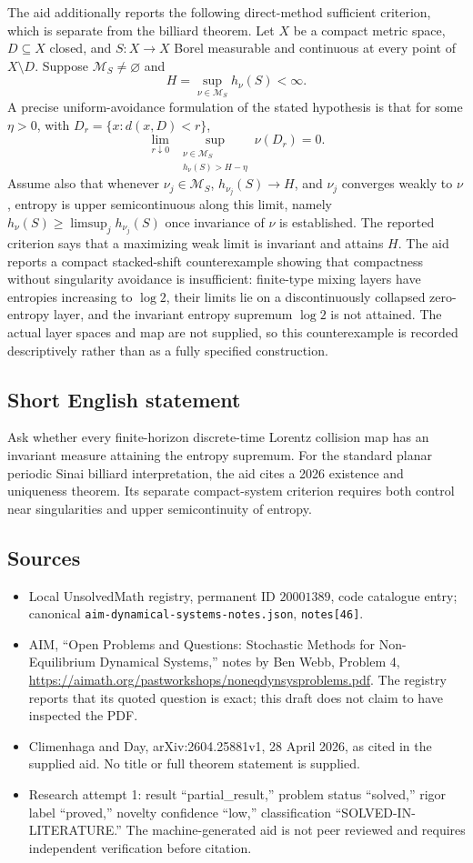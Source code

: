 \documentclass[11pt]{article}
\begin{document}
The aid additionally reports the following direct-method sufficient criterion, which is separate from the billiard theorem. Let \(X\) be a compact metric space, \(D\subseteq X\) closed, and \(S:X\to X\) Borel measurable and continuous at every point of \(X\setminus D\). Suppose \(\mathcal M_S\ne\varnothing\) and
\[
 H=\sup_{\nu\in\mathcal M_S}h_\nu(S)<\infty.
\]
A precise uniform-avoidance formulation of the stated hypothesis is that for some \(\eta>0\), with \(D_r=\{x:d(x,D)<r\}\),
\[
 \lim_{r\downarrow0}\ \sup_{\substack{\nu\in\mathcal M_S\\h_\nu(S)>H-\eta}}\nu(D_r)=0.
\]
Assume also that whenever \(\nu_j\in\mathcal M_S\), \(h_{\nu_j}(S)\to H\), and \(\nu_j\) converges weakly to \(\nu\), entropy is upper semicontinuous along this limit, namely \(h_\nu(S)\geq\limsup_jh_{\nu_j}(S)\) once invariance of \(\nu\) is established. The reported criterion says that a maximizing weak limit is invariant and attains \(H\). The aid reports a compact stacked-shift counterexample showing that compactness without singularity avoidance is insufficient: finite-type mixing layers have entropies increasing to \(\log2\), their limits lie on a discontinuously collapsed zero-entropy layer, and the invariant entropy supremum \(\log2\) is not attained. The actual layer spaces and map are not supplied, so this counterexample is recorded descriptively rather than as a fully specified construction.
\subsection{Short English statement}
Ask whether every finite-horizon discrete-time Lorentz collision map has an invariant measure attaining the entropy supremum. For the standard planar periodic Sinai billiard interpretation, the aid cites a 2026 existence and uniqueness theorem. Its separate compact-system criterion requires both control near singularities and upper semicontinuity of entropy.
\subsection{Sources}
\begin{itemize}
\item Local UnsolvedMath registry, permanent ID \(20001389\), code catalogue entry; canonical \texttt{aim-dynamical-systems-notes.json}, \texttt{notes[46]}.
\item AIM, ``Open Problems and Questions: Stochastic Methods for Non-Equilibrium Dynamical Systems,'' notes by Ben Webb, Problem 4, \url{https://aimath.org/pastworkshops/noneqdynsysproblems.pdf}. The registry reports that its quoted question is exact; this draft does not claim to have inspected the PDF.
\item Climenhaga and Day, arXiv:2604.25881v1, 28 April 2026, as cited in the supplied aid. No title or full theorem statement is supplied.
\item Research attempt 1: result ``partial\_result,'' problem status ``solved,'' rigor label ``proved,'' novelty confidence ``low,'' classification ``SOLVED-IN-LITERATURE.'' The machine-generated aid is not peer reviewed and requires independent verification before citation.
\end{itemize}
\end{document}
